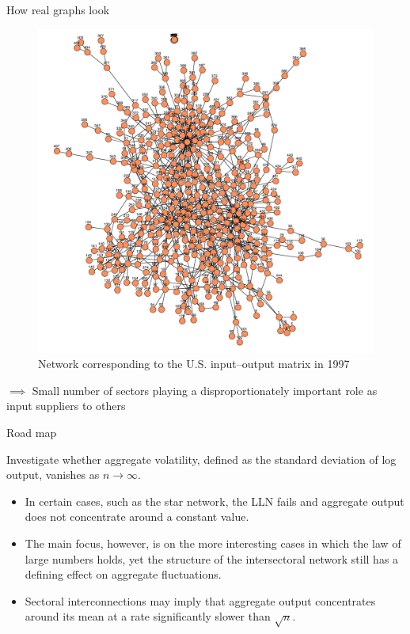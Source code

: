 \documentclass[dvipsnames]{beamer}
\begin{document}
\begin{frame}{How real graphs look}
    \justifying
    \begin{figure}[H]
        \caption*{Network corresponding to the U.S. input–output matrix in 1997}
        \includegraphics[scale=0.4]{3}
        \centering
      \end{figure}   

      $\implies$  Small number of sectors playing a disproportionately
      important role as input suppliers to others
\end{frame}

\begin{frame}{Road map}
    \justifying    

    Investigate whether aggregate volatility, defined as the standard deviation of log
    output, vanishes as $n\rightarrow\infty$.\\[10pt]
    \begin{itemize}
        \justifying    
        \item In certain cases, such as the star network,
        the LLN fails and aggregate output does not concentrate
        around a constant value.
        \item The main focus, however, is on the more interesting cases
        in which the law of large numbers holds, yet the structure of the intersectoral
        network still has a defining effect on aggregate fluctuations.
        \item  Sectoral interconnections may imply that aggregate output concentrates around its
        mean at a rate significantly slower than $\sqrt{n}$.
    \end{itemize} 

    \end{frame}
\end{document}
